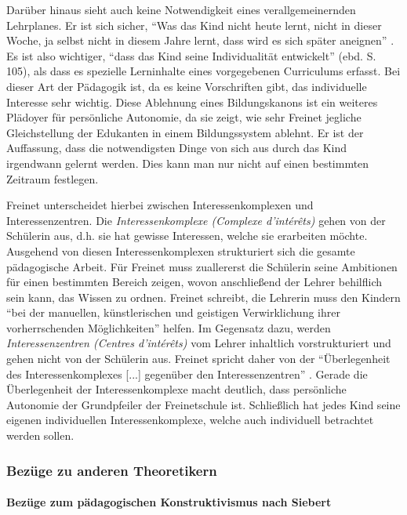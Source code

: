 Darüber hinaus sieht \citeauthor{Freinet1979} auch keine Notwendigkeit eines verallgemeinernden Lehrplanes.
Er ist sich sicher, ``Was das Kind nicht heute lernt, nicht in dieser Woche, ja selbst nicht in diesem Jahre lernt, dass wird es sich später aneignen'' \parencite[~101]{Freinet1979}.
Es ist also wichtiger, ``dass das Kind seine Individualität entwickelt'' (ebd. S. 105), als dass es spezielle Lerninhalte eines vorgegebenen Curriculums erfasst.
Bei dieser Art der Pädagogik ist, da es keine Vorschriften gibt, das individuelle Interesse sehr wichtig.
Diese Ablehnung eines Bildungskanons ist ein weiteres Plädoyer für persönliche Autonomie, da sie zeigt, wie sehr Freinet jegliche Gleichstellung der Edukanten in einem Bildungssystem ablehnt.
Er ist der Auffassung, dass die notwendigsten Dinge von sich aus durch das Kind irgendwann gelernt werden.
Dies kann man nur nicht auf einen bestimmten Zeitraum festlegen.

Freinet unterscheidet hierbei zwischen Interessenkomplexen und Interessenzentren.
Die \emph{Interessenkomplexe (Complexe d'intérêts)} gehen von der Schülerin aus, d.h. sie hat gewisse Interessen, welche sie erarbeiten möchte.
Ausgehend von diesen Interessenkomplexen strukturiert sich die gesamte pädagogische Arbeit.
Für Freinet muss zuallererst die Schülerin seine Ambitionen für einen bestimmten Bereich zeigen, wovon anschließend der Lehrer behilflich sein kann, das Wissen zu ordnen.
Freinet schreibt, die Lehrerin muss den Kindern ``bei der manuellen, künstlerischen und geistigen Verwirklichung ihrer vorherrschenden Möglichkeiten'' \parencite[~90]{Freinet1979} helfen.
Im Gegensatz dazu, werden \emph{Interessenzentren (Centres d'intérêts)} vom Lehrer inhaltlich vorstrukturiert und gehen nicht von der Schülerin aus.
Freinet spricht daher von der ``Überlegenheit des Interessenkomplexes [...] gegenüber den Interessenzentren'' \parencite[~89]{Freinet1979}.
Gerade die Überlegenheit der Interessenkomplexe macht deutlich, dass persönliche Autonomie der Grundpfeiler der Freinetschule ist.
Schließlich hat jedes Kind seine eigenen individuellen Interessenkomplexe, welche auch individuell betrachtet werden sollen.

\subsubsection{Bezüge zu anderen Theoretikern}

\paragraph{Bezüge zum pädagogischen Konstruktivismus nach Siebert}

